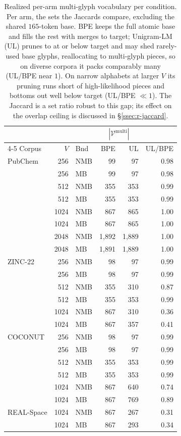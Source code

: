 \begin{table}[htbp]
  \centering
  \caption{Realized per-arm multi-glyph vocabulary per condition. Per arm, the sets the Jaccards compare, excluding the shared $165$-token base. BPE keeps the full atomic base and fills the rest with merges to target; Unigram-LM (UL) prunes to at or below target and may shed rarely-used base glyphs, reallocating to multi-glyph pieces, so on diverse corpora it packs comparably many (UL/BPE near $1$). On narrow alphabets at larger $V$ its pruning runs short of high-likelihood pieces and bottoms out well below target (UL/BPE $\ll 1$). The Jaccard is a set ratio robust to this gap; its effect on the overlap ceiling is discussed in \S\ref{ssec:r-jaccard}.}
  \label{tab:results-realized-vocab}
  \footnotesize
  \begin{tabular}{@{}l r l r r r@{}}
    \toprule
    & & & \multicolumn{2}{c}{$|\mathcal{V}^{\mathrm{multi}}|$} & \\
    \cmidrule(lr){4-5}
    Corpus & $V$ & Bnd & BPE & UL & UL/BPE \\
    \midrule
    PubChem & 256 & NMB & 99 & 97 & 0.98 \\
     & 256 & MB & 99 & 97 & 0.98 \\
     & 512 & NMB & 355 & 353 & 0.99 \\
     & 512 & MB & 355 & 353 & 0.99 \\
     & 1024 & NMB & 867 & 865 & 1.00 \\
     & 1024 & MB & 867 & 865 & 1.00 \\
     & 2048 & NMB & 1,892 & 1,889 & 1.00 \\
     & 2048 & MB & 1,891 & 1,889 & 1.00 \\
    \addlinespace
    ZINC-22 & 256 & NMB & 98 & 97 & 0.99 \\
     & 256 & MB & 98 & 97 & 0.99 \\
     & 512 & NMB & 355 & 310 & 0.87 \\
     & 512 & MB & 355 & 353 & 0.99 \\
     & 1024 & NMB & 867 & 310 & 0.36 \\
     & 1024 & MB & 867 & 357 & 0.41 \\
    \addlinespace
    COCONUT & 256 & NMB & 98 & 97 & 0.99 \\
     & 256 & MB & 98 & 97 & 0.99 \\
     & 512 & NMB & 355 & 353 & 0.99 \\
     & 512 & MB & 355 & 353 & 0.99 \\
     & 1024 & NMB & 867 & 640 & 0.74 \\
     & 1024 & MB & 867 & 769 & 0.89 \\
    \addlinespace
    REAL-Space & 1024 & NMB & 867 & 267 & 0.31 \\
     & 1024 & MB & 867 & 293 & 0.34 \\
    \bottomrule
  \end{tabular}
\end{table}
